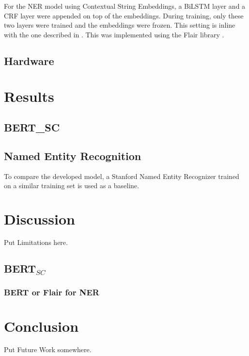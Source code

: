 \documentclass{report}
\theoremstyle{definition}
\theoremstyle{remark}
\begin{document}
For the NER model using Contextual String Embeddings, a BiLSTM layer and a CRF layer were appended on top of the embeddings. During training, only these two layers were trained and the embeddings were frozen. This setting is inline with the one described in \cite{flairpaper}. This was implemented using the Flair library  \textcolor{red}{\cite{}}.

\section{Hardware}
\chapter{Results}
\section{BERT_{SC}}
\section{Named Entity Recognition}

To compare the developed model, a Stanford Named Entity Recognizer \cite{stanfordNER} trained on a similar training set is used as a baseline.


\chapter{Discussion}
Put Limitations here.
\section{BERT$_{SC}$}
\subsection{BERT or Flair for NER}

\chapter{Conclusion}
Put Future Work somewhere.
\end{document}
